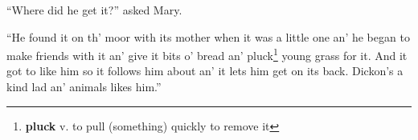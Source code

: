 ``Where did he get it?'' asked Mary.

``He found it on th' moor with its mother when it was a little one an' he began to make friends with it an' give it bits o' bread an' pluck\footnote{\textbf{pluck} v. to pull (something) quickly to remove it} young grass for it. And it got to like him so it follows him about an' it lets him get on its back. Dickon's a kind lad an' animals likes him.''
